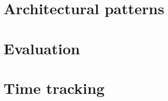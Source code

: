 \documentclass[11pt, oneside]{book}
\begin{document}
\chapter{Architectural patterns}
\label{chp:patterns}


\chapter{Evaluation}
\label{chp:evaluation}


%

\listoftodos[Notes]

\appendix

\chapter{Time tracking}
\label{chp:time_track}


\backmatter

\printbibliography
\end{document}
